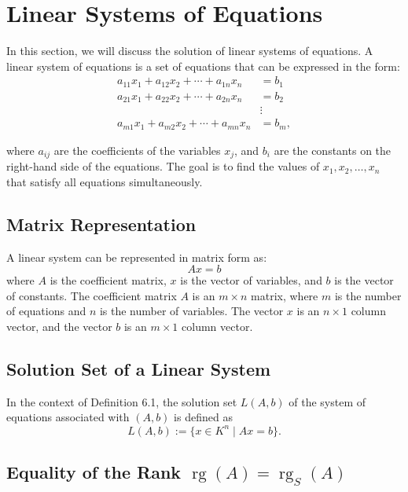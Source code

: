 \newpage
\section{Linear Systems of Equations}

In this section, we will discuss the solution of linear systems of equations. A linear system of equations is a set of equations that can be expressed in the form:
\begin{align*}
a_{11}x_1 + a_{12}x_2 + \cdots + a_{1n}x_n & = b_1  \\
a_{21}x_1 + a_{22}x_2 + \cdots + a_{2n}x_n & = b_2  \\
& \vdots \\
a_{m1}x_1 + a_{m2}x_2 + \cdots + a_{mn}x_n & = b_m,
\end{align*}

where \( a_{ij} \) are the coefficients of the variables \( x_j \), and \( b_i \) are the constants on the right-hand side of the equations. The goal is to find the values of \( x_1, x_2, \ldots, x_n \) that satisfy all equations simultaneously.

\subsection{Matrix Representation}

A linear system can be represented in matrix form as:
\begin{equation*}
	A x = b
\end{equation*}
where \( A \) is the coefficient matrix, \( x \) is the vector of variables, and \( b \) is the vector of constants. The coefficient matrix \( A \) is an \( m \times n \) matrix, where \( m \) is the number of equations and \( n \) is the number of variables.
The vector \( x \) is an \( n \times 1 \) column vector, and the vector \( b \) 
is an \( m \times 1 \) column vector. 


\subsection{Solution Set of a Linear System}

In the context of Definition 6.1, the solution set \( L(A, b) \) of the system of equations associated with \( (A, b) \) is defined as
\[
L(A, b) := \{ x \in K^n \mid Ax = b \}.
\]

\subsection{Equality of the Rank \texorpdfstring{\(\operatorname{rg}(A) = \operatorname{rg}_S(A)\)}{}}

